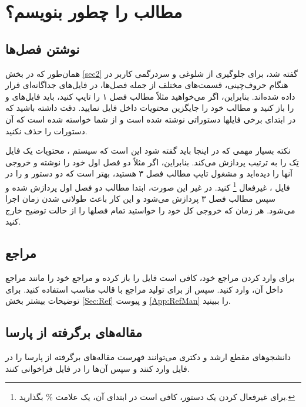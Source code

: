 \section[مطالب پروژه را چطور بنویسم؟]
{مطالب \پ را چطور بنویسم؟}
\subsection{نوشتن فصل‌ها}
همان‌طور که در بخش \ref{sec2} گفته شد، برای جلوگیری از شلوغی و سردرگمی کاربر در هنگام حروف‌چینی، قسمت‌های مختلف \پ از جمله فصل‌ها، در فایل‌های جداگانه‌ای قرار داده شده‌اند. 
بنابراین، اگر می‌خواهید مثلاً مطالب فصل ۱ را تایپ کنید، باید فایل‌های 
و
را باز کنید و مطالب خود را جایگزین محتویات داخل فایل 
نمایید. دقت داشته باشید که در ابتدای برخی فایلها دستوراتی نوشته شده است و از شما خواسته شده است که آن دستورات را حذف نکنید.


نکته بسیار مهمی که در اینجا باید گفته شود این است که سیستم \lr{\TeX}، محتویات یک فایل تِک را به ترتیب پردازش می‌کند.  بنابراین، اگر مثلاً  دو فصل اول خود را نوشته و خروجی آنها را دیده‌اید و مشغول تایپ مطالب فصل ۳ هستید، بهتر است
که دو دستور 
\verb!!
و
\verb!!
را در فایل 
،
غیرفعال%
\footnote{
برای غیرفعال کردن یک دستور، کافی است در ابتدای آن، یک علامت
\%
 بگذارید.
}
 کنید.  در غیر این صورت، ابتدا مطالب دو فصل اول  پردازش شده و سپس مطالب فصل ۳ پردازش می‌شود و این کار باعث طولانی شدن زمان اجرا می‌شود. هر زمان که خروجی کل \پ خود را خواستید تمام فصلها را از حالت توضیح خارج کنید.

\subsection{مراجع}
برای وارد کردن مراجع \پ خود، کافی است فایل 
را باز کرده و مراجع خود را مانند مراجع داخل آن، وارد کنید.  سپس از  برای تولید مراجع با قالب مناسب استفاده کنید. برای توضیحات بیشتر بخش \ref{Sec:Ref} و پیوست \ref{App:RefMan} را ببینید.
\subsection{مقاله‌های برگرفته از پارسا}
دانشجوهای مقطع ارشد و دکتری می‌توانند فهرست مقاله‌های برگرفته از پارسا را در فایل 
وارد کنند و سپس آن‌ها را در فایل
فراخوانی کنند.
